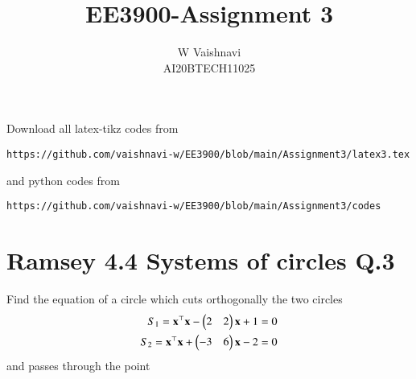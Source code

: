 \documentclass[journal,12pt,twocolumn]{IEEEtran}
\begin{document}
     \def\centbox#1{\makebox[0in]{#1}}
     \def\topbox#1{\raisebox{-\baselineskip}[0in][0in]{#1}}
     \def\midbox#1{\raisebox{-0.5\baselineskip}[0in][0in]{#1}}
\vspace{3cm}
\title{EE3900-Assignment 3}
\author{W Vaishnavi\\AI20BTECH11025}
\maketitle
\newpage
\bigskip
\renewcommand{\thefigure}{\theenumi}
\renewcommand{\thetable}{\theenumi}
Download all latex-tikz codes from 
%
\begin{lstlisting}
https://github.com/vaishnavi-w/EE3900/blob/main/Assignment3/latex3.tex
\end{lstlisting}
and python codes from 
%
\begin{lstlisting}
https://github.com/vaishnavi-w/EE3900/blob/main/Assignment3/codes
\end{lstlisting}
\section{Ramsey 4.4 Systems of circles Q.3}
Find the equation of a circle which cuts orthogonally the two circles 
\begin{align}
    S_1 = \mathbf{x}^\top\mathbf{x} - \begin{pmatrix}2&2\end{pmatrix}\mathbf{x} + 1 = 0 \label{circle1}\\
    S_2 = \mathbf{x}^\top\mathbf{x} + \begin{pmatrix}-3&6\end{pmatrix}\mathbf{x} - 2 = 0 \label{circle2}
\end{align}
and passes through the point 
\end{document}
